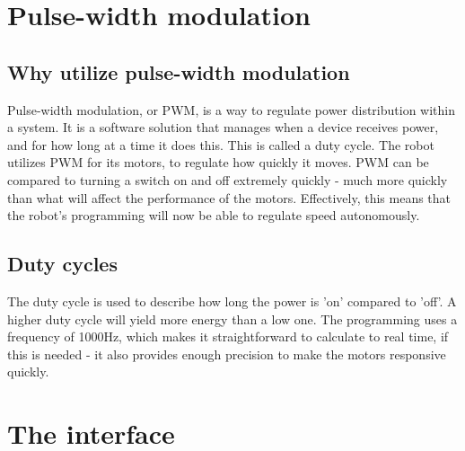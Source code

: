 \section{Pulse-width modulation}

\subsection {Why utilize pulse-width modulation}

Pulse-width modulation, or PWM, is a way to regulate power distribution within a system. It is a software solution that manages when a device receives power, and for how long at a time it does this. This is called a duty cycle. The robot utilizes PWM for its motors, to regulate how quickly it moves. PWM can be compared to turning a switch on and off extremely quickly - much more quickly than what will affect the performance of the motors. Effectively, this means that the robot's programming will now be able to regulate speed autonomously. 
 
\subsection {Duty cycles}

The duty cycle is used to describe how long the power is 'on' compared to 'off'. A higher duty cycle will yield more energy than a low one. The programming uses a frequency of 1000Hz, which makes it straightforward to calculate to real time, if this is needed - it also provides enough precision to make the motors responsive quickly.

\section{The interface}
